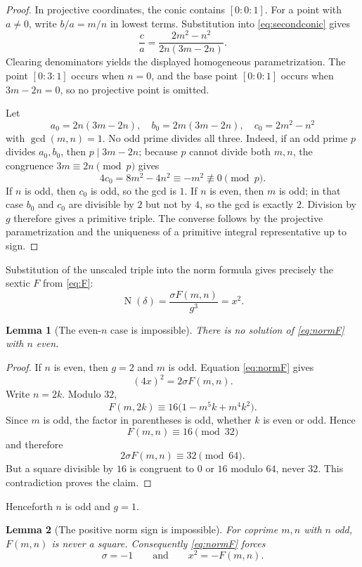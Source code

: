 \documentclass[11pt,a4paper]{article}
\newtheorem{lemma}[lemma]{Lemma}
\newcommand{\Norm}{\operatorname{N}}
\begin{document}
\begin{proof}
In projective coordinates, the conic contains $[0:0:1]$.  For a point
with $a\ne0$, write $b/a=m/n$ in lowest terms.  Substitution into
\eqref{eq:secondconic} gives
\[
\frac ca=\frac{2m^2-n^2}{2n(3m-2n)}.
\]
Clearing denominators yields the displayed homogeneous parametrization.
The point $[0:3:1]$ occurs when $n=0$, and the base point $[0:0:1]$
occurs when $3m-2n=0$, so no projective point is omitted.

Let
\[
a_0=2n(3m-2n),\quad
b_0=2m(3m-2n),\quad
c_0=2m^2-n^2
\]
with $\gcd(m,n)=1$.  No odd prime divides all three.  Indeed, if an odd
prime $p$ divides $a_0,b_0$, then $p\mid3m-2n$; because $p$ cannot divide
both $m,n$, the congruence $3m\equiv2n\pmod p$ gives
\[
4c_0=8m^2-4n^2\equiv-m^2\not\equiv0\pmod p.
\]
If $n$ is odd, then $c_0$ is odd, so the gcd is $1$.  If $n$ is even,
then $m$ is odd; in that case $b_0$ and $c_0$ are divisible by $2$ but
not by $4$, so the gcd is exactly $2$.  Division by $g$ therefore gives
a primitive triple.  The converse follows by the projective
parametrization and the uniqueness of a primitive integral representative
up to sign.
\end{proof}

Substitution of the unscaled triple into the norm formula gives precisely
the sextic $F$ from \eqref{eq:F}:
\begin{equation}\label{eq:normF}
\Norm(\delta)=\frac{\sigma F(m,n)}{g^3}=x^2.
\end{equation}

\begin{lemma}[The even-$n$ case is impossible]\label{lem:neven}
There is no solution of \eqref{eq:normF} with $n$ even.
\end{lemma}

\begin{proof}
If $n$ is even, then $g=2$ and $m$ is odd.  Equation
\eqref{eq:normF} gives
\[
(4x)^2=2\sigma F(m,n).
\]
Write $n=2k$.  Modulo $32$,
\[
F(m,2k)
\equiv16\bigl(1-m^5k+m^4k^2\bigr).
\]
Since $m$ is odd, the factor in parentheses is odd, whether $k$ is even
or odd.  Hence
\[
F(m,n)\equiv16\pmod{32}
\]
and therefore
\[
2\sigma F(m,n)\equiv32\pmod{64}.
\]
But a square divisible by $16$ is congruent to $0$ or $16$ modulo $64$,
never $32$.  This contradiction proves the claim.
\end{proof}

Henceforth $n$ is odd and $g=1$.

\begin{lemma}[The positive norm sign is impossible]\label{lem:Fsign}
For coprime $m,n$ with $n$ odd, $F(m,n)$ is never a square.  Consequently
\eqref{eq:normF} forces
\[
\sigma=-1
\qquad\text{and}\qquad
x^2=-F(m,n).
\]
\end{lemma}
\end{document}
